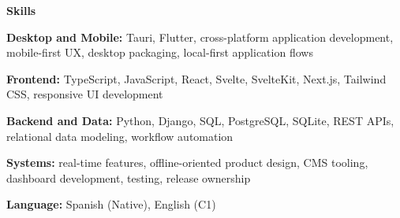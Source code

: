 \documentclass[11pt]{article}
\begin{document}
\begin{center}
    \textbf{Skills}
\end{center}

\textbf{Desktop and Mobile:} Tauri, Flutter, cross-platform application development, mobile-first UX, desktop packaging, local-first application flows

\textbf{Frontend:} TypeScript, JavaScript, React, Svelte, SvelteKit, Next.js, Tailwind CSS, responsive UI development

\textbf{Backend and Data:} Python, Django, SQL, PostgreSQL, SQLite, REST APIs, relational data modeling, workflow automation

\textbf{Systems:} real-time features, offline-oriented product design, CMS tooling, dashboard development, testing, release ownership

\textbf{Language:} Spanish (Native), English (C1)
\end{document}
